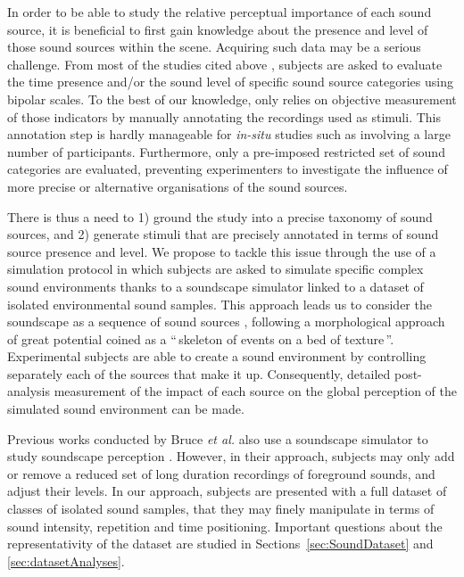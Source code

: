 \documentclass[twoside,twocolumn]{article}
\begin{document}
In order to be able to study the relative perceptual importance of each sound source, it is beneficial to first gain knowledge about the presence and level of those sound sources within the scene. Acquiring such data may be a serious challenge. From most of the studies cited above \cite{guyot2005urban, lavandier2006contribution, ricciardi2015sound}, subjects are asked to evaluate the time presence and/or the sound level of specific sound source categories using bipolar scales. To the best of our knowledge, only \cite{lavandier2006contribution} relies on objective measurement of those indicators by manually annotating the recordings used as stimuli. This annotation step is hardly manageable for \emph{in-situ} studies such as \cite{ricciardi2015sound} involving a large number of participants. Furthermore, only a pre-imposed restricted set of sound categories are evaluated, preventing experimenters to investigate the influence of more precise or alternative organisations of the sound sources.

There is thus a need to 1) ground the study into a precise taxonomy of sound sources, and 2) generate stimuli that are precisely annotated in terms of sound source presence and level. We propose to tackle this issue through the use of a simulation protocol in which subjects are asked to simulate specific complex sound environments thanks to a soundscape simulator linked to a dataset of isolated environmental sound samples. This approach leads us to consider the soundscape as a sequence of sound sources \cite{nelken_ear_2013}, following a morphological approach of great potential coined as a ``\,skeleton of events on a bed of texture\,''. Experimental subjects are able to create a sound environment by controlling separately each of the sources that make it up. Consequently, detailed post-analysis measurement of the impact of each source on the global perception of the simulated sound environment can be made. 

Previous works conducted by Bruce \textit{et al.} also use a soundscape simulator to study soundscape perception \cite{bruce2009development,bruce2014effects}. However, in their approach, subjects may only add or remove a reduced set of long duration recordings of foreground sounds, and adjust their levels. In our approach, subjects are presented with a full dataset of classes of isolated sound samples, that they may finely manipulate in terms of sound intensity, repetition and time positioning. Important questions about the representativity of the  dataset are studied in Sections~\ref{sec:SoundDataset} and  \ref{sec:datasetAnalyses}.
\end{document}
